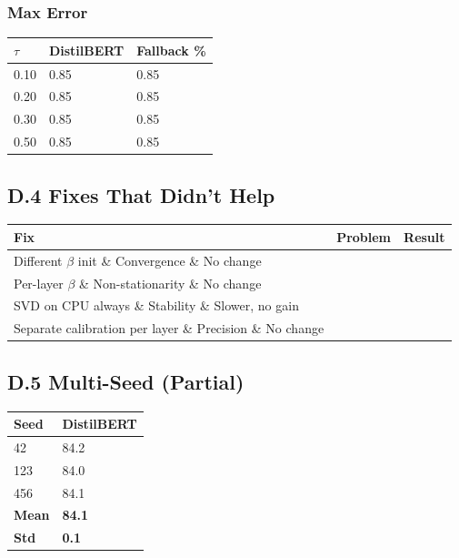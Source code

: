 \subsubsection{Max Error}

\begin{table}[H]
\centering
\small
\begin{tabular}{lll}
\toprule
\textbf{$\tau$} & \textbf{DistilBERT} & \textbf{Fallback \%} \\
\midrule
0.10 & 0.85 & 0.85 \\
0.20 & 0.85 & 0.85 \\
0.30 & 0.85 & 0.85 \\
0.50 & 0.85 & 0.85 \\
\bottomrule
\end{tabular}
\end{table}

\subsection{D.4 Fixes That Didn't Help}

\begin{table}[H]
\centering
\small
\begin{tabular}{lll}
\toprule
\textbf{Fix} & \textbf{Problem} & \textbf{Result} \\
\midrule
Different $\beta$ init \& Convergence \& No change \\
Per-layer $\beta$ \& Non-stationarity \& No change \\
SVD on CPU always \& Stability \& Slower, no gain \\
Separate calibration per layer \& Precision \& No change \\
\bottomrule
\end{tabular}
\end{table}

\subsection{D.5 Multi-Seed (Partial)}

\begin{table}[H]
\centering
\small
\begin{tabular}{ll}
\toprule
\textbf{Seed} & \textbf{DistilBERT} \\
\midrule
42 & 84.2 \\
123 & 84.0 \\
456 & 84.1 \\
\textbf{Mean} & \textbf{84.1} \\
\textbf{Std} & \textbf{0.1} \\
\bottomrule
\end{tabular}
\end{table}


